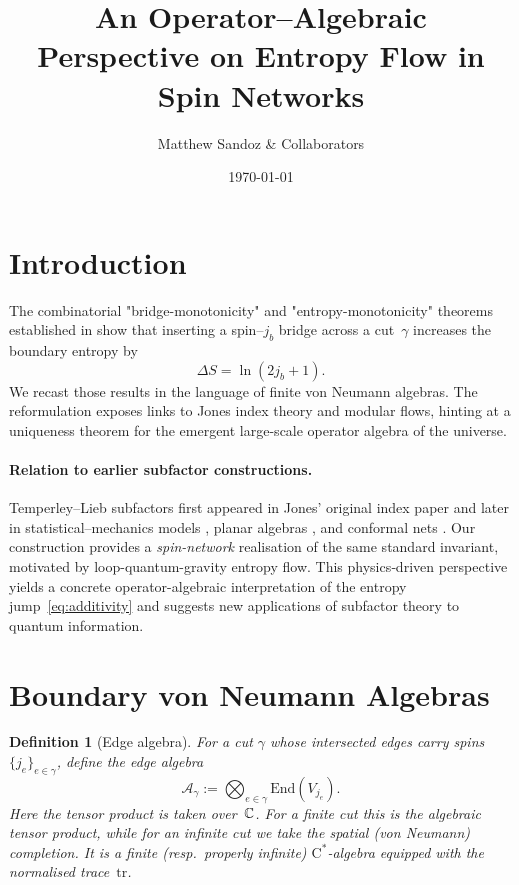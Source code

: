 \documentclass[11pt]{article}
\newtheorem{definition}{Definition}[section]
\begin{document}
\title{An Operator–Algebraic Perspective on Entropy Flow in Spin Networks}
\author{\small Matthew Sandoz \& Collaborators}
\date{\today}
\maketitle

\section{Introduction}
The combinatorial "bridge-monotonicity" and "entropy-monotonicity" theorems
established in \cite{BridgeMono,EntropyMono}
show that inserting a spin–$j_b$ bridge across a cut~$\gamma$ increases the
boundary entropy by
\[
  \Delta S = \ln(2j_b+1).
\]
We recast those results in the language of finite von Neumann algebras.  
The reformulation exposes links to Jones index theory and modular flows, hinting
at a uniqueness theorem for the emergent large-scale operator algebra of the
universe.

\paragraph{Relation to earlier subfactor constructions.}
Temperley--Lieb subfactors first appeared in Jones’ original index
paper \cite{Jones1983} and later in statistical–mechanics models
\cite{KauffmanLins}, planar algebras \cite{JonesPA}, and conformal nets
\cite{KawahigashiLongo}.  
Our construction provides a \emph{spin-network} realisation of the same
standard invariant, motivated by loop-quantum-gravity entropy flow.
This physics‐driven perspective yields a concrete operator-algebraic
interpretation of the entropy jump~\eqref{eq:additivity} and suggests
new applications of subfactor theory to quantum information.


\section{Boundary von Neumann Algebras}

\begin{definition}[Edge algebra]
For a cut $\gamma$ whose intersected edges carry spins
$\{j_e\}_{e\in\gamma}$, define the \emph{edge algebra}
\[
  \mathcal A_{\gamma}
  := \bigotimes_{e\in\gamma} \mathrm{End}(V_{j_e}).
\]
Here the tensor product is taken over~$\Bbb C$.
For a finite cut this is the algebraic tensor product,
while for an infinite cut we take the spatial (von Neumann) completion.
It is a finite (resp.\ properly infinite) $\mathrm C^\ast$-algebra
equipped with the normalised trace~$\mathrm{tr}$.
\end{definition}
\end{document}
